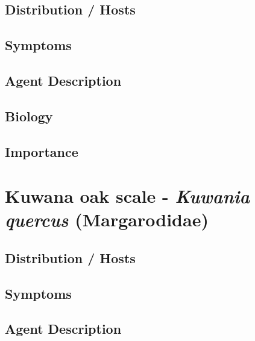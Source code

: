 \documentclass[
]{book}
\begin{document}
\subsection*{Distribution / Hosts}\label{distribution-hosts-11}

\subsection*{Symptoms}\label{symptoms-11}

\subsection*{Agent Description}\label{agent-description-11}

\subsection*{Biology}\label{biology-11}

\subsection*{Importance}\label{importance-11}

\section*{\texorpdfstring{Kuwana oak scale - \emph{Kuwania quercus} (Margarodidae)}{Kuwana oak scale - Kuwania quercus (Margarodidae)}}\label{kuwana-oak-scale---kuwania-quercus-margarodidae}

\subsection*{Distribution / Hosts}\label{distribution-hosts-12}

\subsection*{Symptoms}\label{symptoms-12}

\subsection*{Agent Description}\label{agent-description-12}
\end{document}
